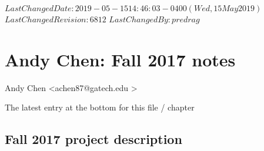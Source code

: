 {$LastChangedDate: 2019-05-15 14:46:03 -0400 (Wed, 15 May 2019) $}
{$LastChangedRevision: 6812 $} {$LastChangedBy: predrag $}

\chapter{Andy Chen: Fall 2017 notes}
\label{chap:blogAC}

\bigskip

\hfill {\large Andy Chen <achen87@gatech.edu >}

\hfill   {\color{red} The latest entry at the bottom for this file / chapter}

\section{Fall 2017 project description}

